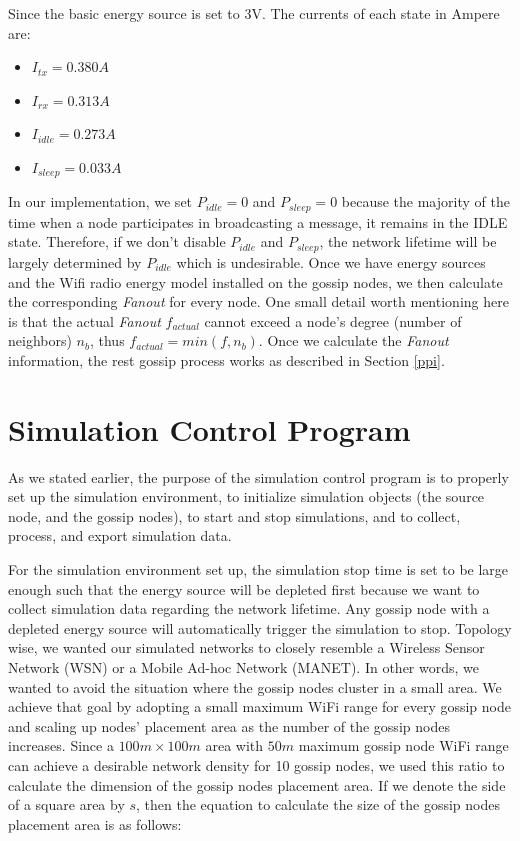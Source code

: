 \documentclass[onehalf,11pt]{beavtex}
\newcommand{\msg}{message}
\begin{document}
Since the basic energy source is set to 3V. The currents of each state in Ampere are:

\begin{itemize}
	\item $I_{tx}=0.380A$
	\item $I_{rx}=0.313A$
	\item $I_{idle}=0.273A$
	\item $I_{sleep}=0.033A$
\end{itemize}

In our implementation, we set $P_{idle}=0$ and $P_{sleep}=0$ because the majority of the time when a node participates in broadcasting a \msg, it remains in the IDLE state. Therefore, if we don't disable $P_{idle}$ and $P_{sleep}$, the network lifetime will be largely determined by $P_{idle}$ which is undesirable. Once we have energy sources and the Wifi radio energy model installed on the gossip nodes, we then calculate the corresponding \emph{Fanout} for every node. One small detail worth mentioning here is that the actual \emph{Fanout} $f_{actual}$ cannot exceed a node's degree (number of neighbors) $n_b$, thus $f_{actual} = min(f, n_b)$. Once we calculate the \emph{Fanout} information, the rest gossip process works as described in Section \ref{ppi}.

\section{Simulation Control Program}

As we stated earlier, the purpose of the simulation control program is to properly set up the simulation environment, to initialize simulation objects (the source node, and the gossip nodes), to start and stop simulations, and to collect, process, and export simulation data.

For the simulation environment set up, the simulation stop time is set to be large enough such that the energy source will be depleted first because we want to collect simulation data regarding the network lifetime. Any gossip node with a depleted energy source will automatically trigger the simulation to stop. Topology wise, we wanted our simulated networks to closely resemble a Wireless Sensor Network (WSN) or a Mobile Ad-hoc Network (MANET). In other words, we wanted to avoid the situation where the gossip nodes cluster in a small area. We achieve that goal by adopting a small maximum WiFi range for every gossip node and scaling up nodes' placement area as the number of the gossip nodes increases. Since a $100m \times 100m$ area with $50m$ maximum gossip node WiFi range can achieve a desirable network density for 10 gossip nodes, we used this ratio to calculate the dimension of the gossip nodes placement area. If we denote the side of a square area by $s$, then the equation to calculate the size of the gossip nodes placement area is as follows:
\end{document}
